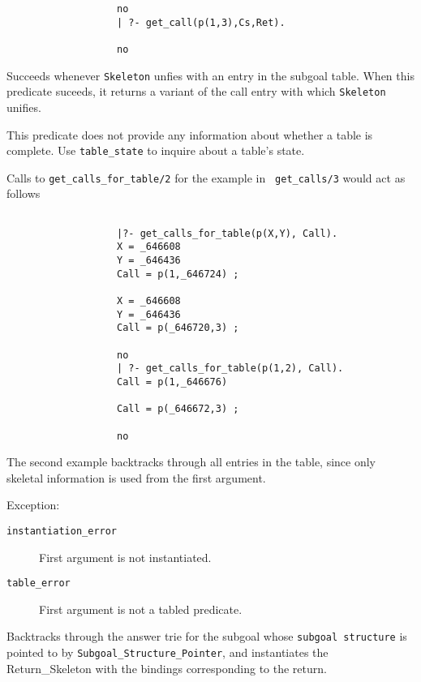 \begin{description}
{\begin{verbatim}
                   no
                   | ?- get_call(p(1,3),Cs,Ret).

                   no

	\end{verbatim}
	}

Succeeds whenever {\tt Skeleton} unfies with an entry in the subgoal
table.  When this predicate suceeds, it returns a variant of the call
entry with which {\tt Skeleton} unifies.  

This predicate does not provide any information about whether a table is
complete.  Use {\tt table\_state} to inquire about a table's state.

\noindent
Calls to {\tt get\_calls\_for\_table/2} for the example in {\tt
get\_calls/3} would act as follows 
%
{\footnotesize
\begin{verbatim} 

                   |?- get_calls_for_table(p(X,Y), Call).  
                   X = _646608 
                   Y = _646436
                   Call = p(1,_646724) ;

                   X = _646608
                   Y = _646436
                   Call = p(_646720,3) ;

                   no
                   | ?- get_calls_for_table(p(1,2), Call).
                   Call = p(1,_646676)

                   Call = p(_646672,3) ;

                   no
     \end{verbatim}
     }
The second example backtracks through all entries in the table, since
only skeletal information is used from the first argument.

Exception:
    \begin{description}
    \item[{\tt instantiation\_error}]
	First argument is not instantiated.
    \item[{\tt table\_error}]
	First argument is not a tabled predicate.
    \end{description}


Backtracks through the answer trie for the subgoal whose {\tt subgoal structure}
is pointed to by {\tt Subgoal\_Structure\_Pointer}, and instantiates the 
{Return\_Skeleton} with the bindings corresponding to the return.


\end{description}
